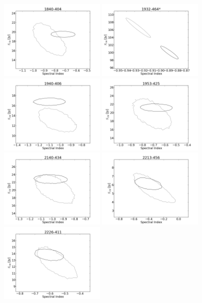 \documentclass[preprint]{aastex}
\begin{document}
\begin{figure}[htbp]
\begin{center}
\includegraphics[width=2in]{plots/1840-404_SI_MCMC.png} %
\includegraphics[width=2in]{plots/1932-464_SI_MCMC.png} %
\includegraphics[width=2in]{plots/1940-406_SI_MCMC.png} %
\includegraphics[width=2in]{plots/1953-425_SI_MCMC.png} %
\includegraphics[width=2in]{plots/2140-434_SI_MCMC.png} %
\includegraphics[width=2in]{plots/2213-456_SI_MCMC.png} %
\includegraphics[width=2in]{plots/2226-411_SI_MCMC.png} %


\end{center}
\end{figure}
\end{document}
